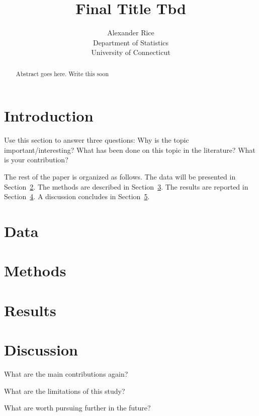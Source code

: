 \documentclass[12pt]{article}
\title{Final Title Tbd}
\author{Alexander Rice\\
  Department of Statistics\\
  University of Connecticut
}
\begin{document}
\maketitle

\begin{abstract}
Abstract goes here. Write this soon

\end{abstract}


\section{Introduction}
\label{sec:intro}

Use this section to answer three questions:
Why is the topic important/interesting?
What has been done on this topic in the literature?
What is your contribution?


The rest of the paper is organized as follows.
The data will be presented in Section~\ref{sec:data}.
The methods are described in Section~\ref{sec:meth}.
The results are reported in Section~\ref{sec:resu}.
A discussion concludes in Section~\ref{sec:disc}.


\section{Data}
\label{sec:data}




\section{Methods}
\label{sec:meth}




\section{Results}
\label{sec:resu}


\section{Discussion}
\label{sec:disc}

What are the main contributions again?

What are the limitations of this study?

What are worth pursuing further in the future?



\end{document}
